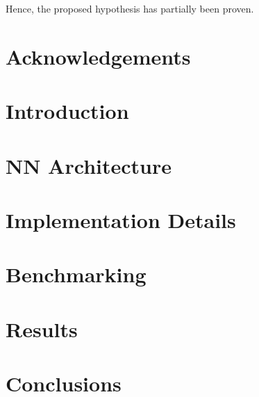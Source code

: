 \documentclass[hidelinks, 12pt]{style}
\begin{document}
Hence, the proposed hypothesis has partially been proven.

\chapter*{Acknowledgements}


\tableofcontents

\listoffigures

\chapter{Introduction}


\chapter{NN Architecture}\label{architecture_chapter}


\chapter{Implementation Details}\label{implementation_chapter}


\chapter{Benchmarking}\label{benchmarking_chapter}


\chapter{Results}\label{results_chapter}


\chapter{Conclusions}\label{conclusion_chapter}


\newpage

\appendix
\renewcommand{\thesection}{\Alph{section}.\arabic{section}}
\setcounter{section}{0}


\printbibliography[heading = bibintoc]
\end{document}
